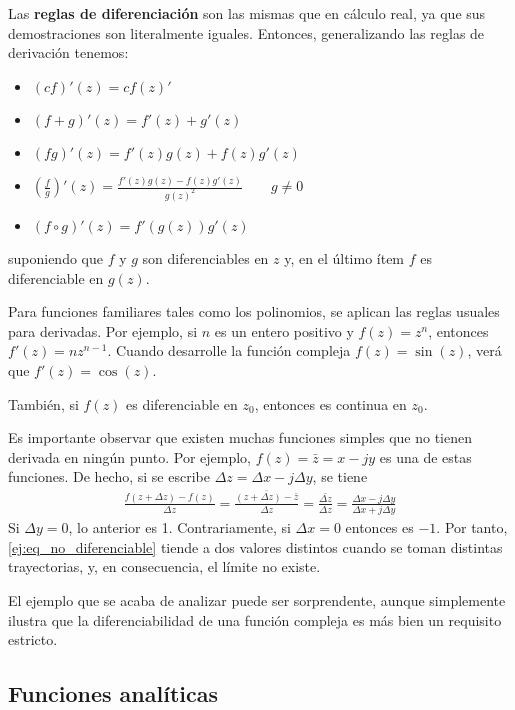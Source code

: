 Las \textbf{reglas de diferenciación} son las mismas que en cálculo real, ya que sus demostraciones son literalmente iguales. Entonces, generalizando las reglas de derivación tenemos:
\begin{itemize}
  \item $(cf)'(z)=cf(z)'$ 
  \item $(f+g)'(z)=f'(z)+g'(z)$
  \item $(fg)'(z)=f'(z)g(z)+f(z)g'(z)$
  \item $\left(\frac{f}{g}\right)'(z)=\frac{f'(z)g(z)-f(z)g'(z)}{g(z)^2}\qquad g\neq 0$
  \item $(f\circ g)'(z) = f'(g(z))g'(z)$
\end{itemize}
suponiendo que $f$ y $g$ son diferenciables en $z$ y, en el último ítem $f$ es diferenciable en $g(z)$.

Para funciones familiares tales como los polinomios, se aplican las reglas usuales para derivadas. Por ejemplo, si $n$ es un entero positivo y $f(z)=z^n$, entonces $f'(z)=nz^{n-1}$. Cuando desarrolle la función compleja $f(z)=\sin(z)$, verá que $f'(z)=\cos(z)$. 

También, si $f(z)$ es diferenciable en $z_0$, entonces es continua en $z_0$.

\begin{example}
  Es importante observar que existen muchas funciones simples que no tienen derivada en ningún punto. Por ejemplo, $f(z)=\bar{z}=x-jy$ es una de estas funciones. De hecho, si se escribe $\Delta z = \Delta x - j\Delta y$, se tiene 
  \begin{align}
    \frac{f(z+\Delta z) - f(z)}{\Delta z} = \frac{\bar{(z+\Delta z)-\bar{z}}}{\Delta z} = \frac{\bar{\Delta z}}{\Delta z} = \frac{\Delta x - j\Delta y}{\Delta x + j\Delta y}
    \label{ej:eq_no_diferenciable}
  \end{align}
  Si $\Delta y = 0$, lo anterior es 1. Contrariamente, si $\Delta x = 0$ entonces es $-1$. Por tanto, \ref{ej:eq_no_diferenciable} tiende a dos valores distintos cuando se toman distintas trayectorias, y, en consecuencia, el límite no existe.
\end{example}

El ejemplo que se acaba de analizar puede ser sorprendente, aunque simplemente ilustra que la diferenciabilidad de una función compleja es más bien un requisito estricto.

\subsection{Funciones analíticas}

